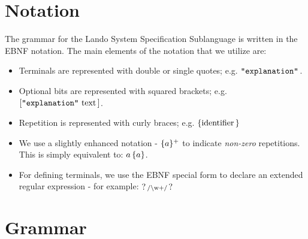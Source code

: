 \documentclass{article}
\begin{document}
\section{Notation}

The grammar for the Lando System Specification Sublanguage is written in the EBNF notation. The main elements of the notation that we utilize are:
\begin{itemize}
  \item Terminals are represented with double or single quotes; e.g. $\mathop{\texttt{"explanation"}}\,$.
  \item Optional bits are represented with squared brackets; e.g. $\mathop{[ \mathop{\texttt{"explanation"}}\, \mathop{\textrm{text}}\, ]}$.
  \item Repetition is represented with curly braces; e.g. $\mathop{\{ \mathop{\textrm{identifier}}\, \}}$
  \item We use a slightly enhanced notation - $\mathop{\{ a \}^+}$ to indicate \emph{non-zero} repetitions. This is simply equivalent to: $a \mathop{\{ a \}}$.
  \item For defining terminals, we use the EBNF special form to declare an extended regular expression - for example: $\mathop{?\, \textrm{\scriptsize /\textbackslash w\\+/} \,?}$
\end{itemize}

\section{Grammar}
\end{document}
